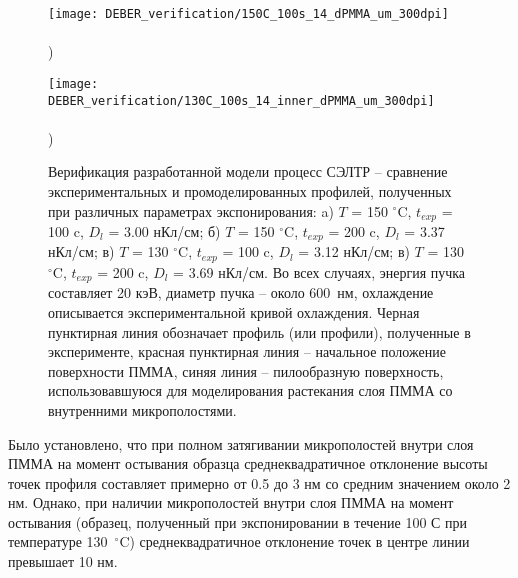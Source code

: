\begin{figure}[h!]
	\begin{minipage}{0.48\textwidth}
		\texttt{[image: DEBER\_verification/150C\_100s\_14\_dPMMA\_um\_300dpi]} \\
		\vspace{-13em} \\ ) \\ \vspace{13em}
	\end{minipage}
	\begin{minipage}{0.48\textwidth}
		\texttt{[image: DEBER\_verification/130C\_100s\_14\_inner\_dPMMA\_um\_300dpi]} \\
		\vspace{-13em} \\ ) \\ \vspace{13em}
	\end{minipage}
	
	\vspace{-3em}
	\caption{Верификация разработанной модели процесс СЭЛТР -- сравнение экспериментальных и промоделированных профилей, полученных при различных параметрах экспонирования: a) $T$ = 150 $^\circ$C, $t_{exp}$ = 100 c, $D_l$ = 3.00 нКл/см; б) $T$ = 150 $^\circ$C, $t_{exp}$ = 200 c, $D_l$ = 3.37 нКл/см; в) $T$ = 130 $^\circ$C, $t_{exp}$ = 100 c, $D_l$ = 3.12 нКл/см; в) $T$ = 130 $^\circ$C, $t_{exp}$ = 200 c, $D_l$ = 3.69 нКл/см. Во всех случаях, энергия пучка составляет 20 кэВ, диаметр пучка -- около 600~нм, охлаждение описывается экспериментальной кривой охлаждения. Черная пунктирная линия обозначает профиль (или профили), полученные в эксперименте, красная пунктирная линия -- начальное положение поверхности ПММА, синяя линия -- пилообразную поверхность, использовавшуюся для моделирования растекания слоя ПММА со внутренними микрополостями.}
	\label{fig:DEBER_4_profiles}
	\vspace{1em}
\end{figure}

Было установлено, что при полном затягивании микрополостей внутри слоя ПММА на момент остывания образца среднеквадратичное отклонение высоты точек профиля составляет примерно от 0.5 до 3 нм со средним значением около 2 нм. Однако, при наличии микрополостей внутри слоя ПММА на момент остывания (образец, полученный при экспонировании в течение 100 С при температуре 130~$^\circ$C) среднеквадратичное отклонение точек в центре линии превышает 10 нм.

